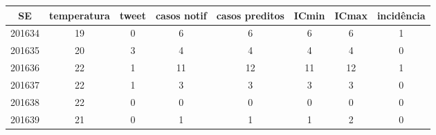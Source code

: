 \begin{tabular}{c|ccccccc}
  \hline
SE & temperatura & tweet & casos notif & casos preditos & ICmin & ICmax & incidência \\ 
  \hline
201634 & 19 & 0 & 6 & 6 & 6 & 6 & 1 \\ 
  201635 & 20 & 3 & 4 & 4 & 4 & 4 & 0 \\ 
  201636 & 22 & 1 & 11 & 12 & 11 & 12 & 1 \\ 
  201637 & 22 & 1 & 3 & 3 & 3 & 3 & 0 \\ 
  201638 & 22 & 0 & 0 & 0 & 0 & 0 & 0 \\ 
  201639 & 21 & 0 & 1 & 1 & 1 & 2 & 0 \\ 
   \hline
\end{tabular}
